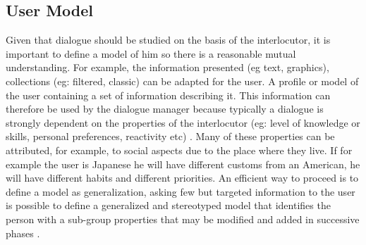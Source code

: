 \documentclass{thesisreport}
\begin{document}
 \subsection{User Model}
 Given that dialogue should be studied on the basis of the interlocutor, it is important to define a model of him so there is a reasonable mutual understanding. For example, the information presented (eg text, graphics), collections (eg: filtered, classic) can be adapted for the user. A profile or model of the user containing a set of information describing it. This information can therefore be used by the dialogue manager because typically a dialogue is strongly dependent on the properties of the interlocutor (eg: level of knowledge or skills, personal preferences, reactivity etc) \cite{fong2001collaboration}.
 Many of these properties can be attributed, for example, to social aspects due to the place where they live. If for example the user is Japanese he will have different customs from an American, he will have different habits and different priorities. An efficient way to proceed is to define a model as generalization, asking few but targeted information to the user is possible to define a generalized and stereotyped model that identifies the person with a sub-group properties that may be modified and added in successive phases \cite{fong2001collaboration}.

  
 
 
 
 
 
\end{document}
